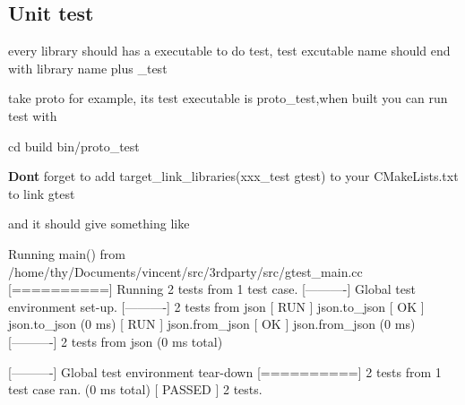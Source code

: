 \subsection*{Unit test}

every library should has a executable to do test, test excutable name should end with library name plus {\ttfamily \+\_\+test}

take {\ttfamily proto} for example, its test executable is {\ttfamily proto\+\_\+test},when built you can run test with 
\begin{DoxyCode}
cd build
bin/proto\_test
\end{DoxyCode}
 {\bfseries Don\textquotesingle{}t} forget to add {\ttfamily target\+\_\+link\+\_\+libraries(xxx\+\_\+test gtest)} to your {\ttfamily C\+Make\+Lists.\+txt} to link {\ttfamily gtest}

and it should give something like 
\begin{DoxyCode}
Running main() from /home/thy/Documents/vincent/src/3rdparty/src/gtest\_main.cc
[==========] Running 2 tests from 1 test case.
[----------] Global test environment set-up.
[----------] 2 tests from json
[ RUN      ] json.to\_json
[       OK ] json.to\_json (0 ms)
[ RUN      ] json.from\_json
[       OK ] json.from\_json (0 ms)
[----------] 2 tests from json (0 ms total)

[----------] Global test environment tear-down
[==========] 2 tests from 1 test case ran. (0 ms total)
[  PASSED  ] 2 tests.
\end{DoxyCode}
 